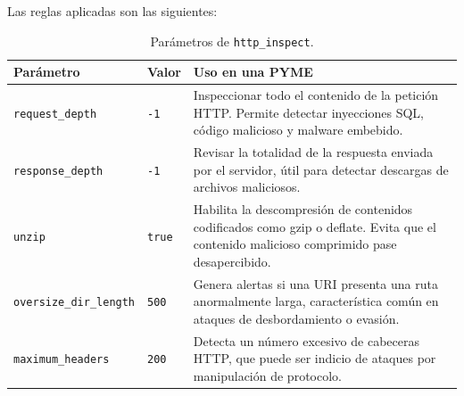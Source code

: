 \documentclass[11pt,a4paper,twoside]{report}
\begin{document}
Las reglas aplicadas son las siguientes:
\newline

\begin{table}[ht]
	\centering
	\begin{tabular}{l l p{7cm}}
		\hline
		\textbf{Parámetro} & \textbf{Valor} & \textbf{Uso en una PYME}\\
		\hline
		\texttt{request\_depth}       & \texttt{-1} & Inspeccionar todo el contenido de la petición HTTP. Permite detectar inyecciones SQL, código malicioso y malware embebido.\\
		\texttt{response\_depth}      & \texttt{-1} & Revisar la totalidad de la respuesta enviada por el servidor, útil para detectar descargas de archivos maliciosos.\\
		\texttt{unzip}                & \texttt{true} & Habilita la descompresión de contenidos codificados como gzip o deflate. Evita que el contenido malicioso comprimido pase desapercibido.\\
		\texttt{oversize\_dir\_length}& \texttt{500} & Genera alertas si una URI presenta una ruta anormalmente larga, característica común en ataques de desbordamiento o evasión.\\
		\texttt{maximum\_headers}     & \texttt{200} & Detecta un número excesivo de cabeceras HTTP, que puede ser indicio de ataques por manipulación de protocolo.\\
		\hline
	\end{tabular}
	\caption{Parámetros de \texttt{http\_inspect}.}
\end{table}
\end{document}
